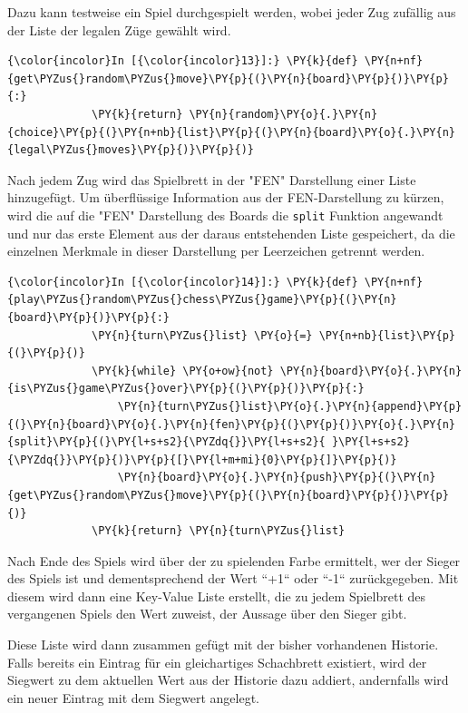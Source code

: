     Dazu kann testweise ein Spiel durchgespielt werden, wobei jeder Zug
zufällig aus der Liste der legalen Züge gewählt wird.

    \begin{Verbatim}[commandchars=\\\{\}]
{\color{incolor}In [{\color{incolor}13}]:} \PY{k}{def} \PY{n+nf}{get\PYZus{}random\PYZus{}move}\PY{p}{(}\PY{n}{board}\PY{p}{)}\PY{p}{:}
             \PY{k}{return} \PY{n}{random}\PY{o}{.}\PY{n}{choice}\PY{p}{(}\PY{n+nb}{list}\PY{p}{(}\PY{n}{board}\PY{o}{.}\PY{n}{legal\PYZus{}moves}\PY{p}{)}\PY{p}{)}
\end{Verbatim}
Nach jedem Zug wird das Spielbrett in der "FEN" Darstellung einer Liste hinzugefügt. Um überflüssige Information aus der FEN-Darstellung zu kürzen, wird die auf die "FEN" Darstellung des Boards die
\texttt{split} Funktion angewandt und nur das erste Element aus der
daraus entstehenden Liste gespeichert, da die einzelnen Merkmale in
dieser Darstellung per Leerzeichen getrennt werden.

    \begin{Verbatim}[commandchars=\\\{\}]
{\color{incolor}In [{\color{incolor}14}]:} \PY{k}{def} \PY{n+nf}{play\PYZus{}random\PYZus{}chess\PYZus{}game}\PY{p}{(}\PY{n}{board}\PY{p}{)}\PY{p}{:}
             \PY{n}{turn\PYZus{}list} \PY{o}{=} \PY{n+nb}{list}\PY{p}{(}\PY{p}{)}
             \PY{k}{while} \PY{o+ow}{not} \PY{n}{board}\PY{o}{.}\PY{n}{is\PYZus{}game\PYZus{}over}\PY{p}{(}\PY{p}{)}\PY{p}{:}
                 \PY{n}{turn\PYZus{}list}\PY{o}{.}\PY{n}{append}\PY{p}{(}\PY{n}{board}\PY{o}{.}\PY{n}{fen}\PY{p}{(}\PY{p}{)}\PY{o}{.}\PY{n}{split}\PY{p}{(}\PY{l+s+s2}{\PYZdq{}}\PY{l+s+s2}{ }\PY{l+s+s2}{\PYZdq{}}\PY{p}{)}\PY{p}{[}\PY{l+m+mi}{0}\PY{p}{]}\PY{p}{)}
                 \PY{n}{board}\PY{o}{.}\PY{n}{push}\PY{p}{(}\PY{n}{get\PYZus{}random\PYZus{}move}\PY{p}{(}\PY{n}{board}\PY{p}{)}\PY{p}{)}
             \PY{k}{return} \PY{n}{turn\PYZus{}list}
\end{Verbatim}


    Nach Ende des Spiels wird über der zu spielenden Farbe ermittelt, wer
der Sieger des Spiels ist und dementsprechend der Wert ``+1`` oder ``-1``
zurückgegeben. Mit diesem wird dann eine Key-Value Liste erstellt, die
zu jedem Spielbrett des vergangenen Spiels den Wert zuweist, der Aussage
über den Sieger gibt.

Diese Liste wird dann zusammen gefügt mit der bisher vorhandenen
Historie. Falls bereits ein Eintrag für ein gleichartiges Schachbrett
existiert, wird der Siegwert zu dem aktuellen Wert aus der Historie dazu
addiert, andernfalls wird ein neuer Eintrag mit dem Siegwert angelegt.

